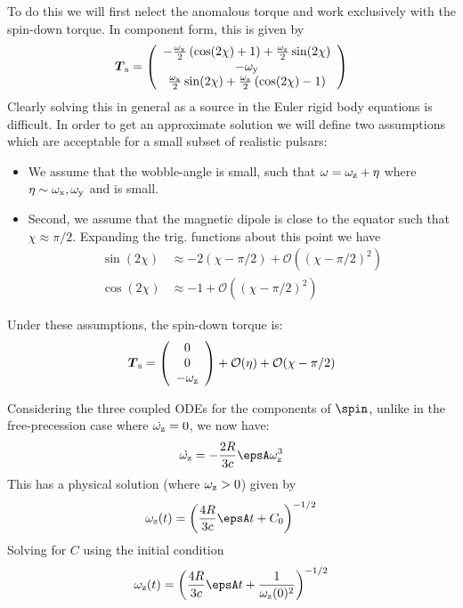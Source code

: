 \documentclass[/home/greg/Thesis/main/main.tex]{subfiles}
\begin{document}
To 
do this we will first nelect the anomalous torque and work exclusively with the
spin-down torque. In component form, this is given by
\begin{align}
\boldsymbol{T}_{\mathrm{s}} = \left(\begin{array}{c}
-\frac{\omega_{\mathrm{x}}}{2}\left(\cos(2\chi) + 1\right) + \frac{\omega_{\mathrm{z}}}{2}\sin(2\chi) \\
-\omega_{\mathrm{y}} \\
\frac{\omega_{\mathrm{x}}}{2}\sin(2\chi) + \frac{\omega_{\mathrm{z}}}{2}\left(\cos(2\chi) - 1\right) 
\end{array}\right)
\end{align}
Clearly solving this in general as a source in the Euler rigid body equations is
difficult. In order to get an approximate solution we will define two assumptions
which are acceptable for a small subset of realistic pulsars:
\begin{itemize}
\item We assume that the wobble-angle is small, such that $\omega = \omega_{\mathrm{z}} + \eta$
      where $\eta \sim \omega_{\mathrm{x}}, \omega_{\mathrm{y}}$ and is small.
\item Second, we assume that the magnetic dipole is close to the equator such
      that $\chi \approx \pi/2$. Expanding the trig. functions about this point
      we have
\begin{align}
\sin(2\chi) &\approx -2\left(\chi - \pi/2\right) + \mathcal{O}\left(\left(\chi - \pi/2\right)^{2}\right) \\
\cos(2\chi) &\approx -1 + \mathcal{O}\left(\left(\chi - \pi/2\right)^{2}\right)
\end{align}
\end{itemize}

Under these assumptions, the spin-down torque is:
\begin{align}
\boldsymbol{T}_{\mathrm{s}} = \left(\begin{array}{c}
0 \\
0 \\
-\omega_{\mathrm{z}} 
\end{array}\right) + \mathcal{O}(\eta) + \mathcal{O}(\chi - \pi/2)
\end{align}

Considering the three coupled ODEs for the components of $\spin$, unlike in the
free-precession case where $\dot{\omega_{\mathrm{z}}} = 0$, we now have:
\begin{align}
\dot{\wz} = -\frac{2R}{3c} \epsA \wz^{3}
\end{align}
This has a physical solution (where $\omega_{\mathrm{z}} > 0$) given by 
\begin{align}
\wz(t) = \left(\frac{4R}{3c} \epsA t + C_0 \right)^{-1/2}
\end{align}
Solving for $C$ using the initial condition
\begin{align}
\wz(t) = \left(\frac{4R}{3c} \epsA t + \frac{1}{\wz(0)^{2}}\right)^{-1/2}
\label{eqn: wz with torque}
\end{align}
\end{document}
